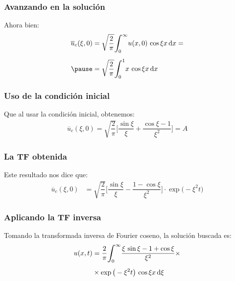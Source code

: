 \documentclass[12pt]{beamer}
\begin{document}
\begin{frame}
\frametitle{Avanzando en la solución}
Ahora bien:
\pause
\begin{eqnarray*}
\begin{aligned}
\overline{u}_{c} (\xi, 0) &= \sqrt{\dfrac{2}{\pi}} \scaleint{6ex}_{\bs 0}^{\infty} u(x, 0) \, \cos \xi x \dd{x} = \\[0.5em] \pause
&= \sqrt{\dfrac{2}{\pi}} \scaleint{6ex}_{\bs 0}^{1} x \, \cos \xi x \dd{x}
\end{aligned}
\end{eqnarray*}
\end{frame}
\begin{frame}
\frametitle{Uso de la condición inicial}
Que al usar la condición inicial, obtenemos:
\pause
\begin{align*}
\overline{u}_{c} (\xi, 0) = \sqrt{\dfrac{2}{\pi}} \bigg[ \dfrac{\sin \xi}{\xi} + \dfrac{\cos \xi - 1}{\xi^{2}} \bigg] = A
\end{align*}
\end{frame}
\begin{frame}
\frametitle{La TF obtenida}
Este resultado nos dice que:
\pause
\begin{align*}
\overline{u}_{c} (\xi, 0) &= \sqrt{\dfrac{2}{\pi}} \bigg[ \dfrac{\sin \xi}{\xi} - \dfrac{1 - \cos \xi}{\xi^{2}} \bigg] \cdot \exp\big( -\xi^{2} t \big)
\end{align*}
\end{frame}
\begin{frame}
\frametitle{Aplicando la TF inversa}
Tomando la transformada inversa de Fourier coseno, la solución buscada es:
\pause
\begin{align*}
u(x, t) &= \dfrac{2}{\pi} \scaleint{6ex}_{\bs 0}^{\infty} \dfrac{\xi \, \sin \xi - 1 + \cos \xi}{\xi^{2}} \times \\[0.5em]
&\times \exp \big( - \xi^{2} t \big) \, \cos \xi x \dd{\xi}
\end{align*}
\end{frame}
\end{document}
